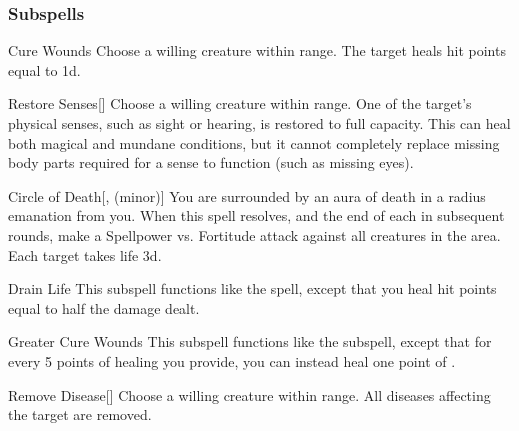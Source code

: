 \subsubsection{Subspells}


\begin{ability}[\nth{1}]{Cure Wounds}
Choose a willing creature within \rngmed range.
The target heals hit points equal to  \plus1d.
\end{ability}
\vspace{0.25em}


\begin{ability}[\nth{2}]{Restore Senses}[]
Choose a willing creature within \rngclose range.
One of the target's physical senses, such as sight or hearing, is restored to full capacity.
This can heal both magical and mundane conditions, but it cannot completely replace missing body parts required for a sense to function (such as missing eyes).
\end{ability}
\vspace{0.25em}


\begin{ability}[\nth{3}]{Circle of Death}[,  (minor)]
You are surrounded by an aura of death in a \areamed radius emanation from you.
When this spell resolves, and the end of each  in subsequent rounds, make a Spellpower vs. Fortitude attack against all creatures in the area.
\hit Each target takes life  \minus3d.
\end{ability}
\vspace{0.25em}


\begin{ability}[\nth{3}]{Drain Life}
This subspell functions like the  spell, except that you heal hit points equal to half the damage dealt.
\end{ability}
\vspace{0.25em}


\begin{ability}[\nth{3}]{Greater Cure Wounds}
This subspell functions like the  subspell, except that for every 5 points of healing you provide, you can instead heal one point of .
\end{ability}
\vspace{0.25em}


\begin{ability}[\nth{3}]{Remove Disease}[]
Choose a willing creature within \rngclose range.
All diseases affecting the target are removed.
\end{ability}
\vspace{0.25em}


